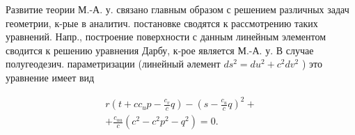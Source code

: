 \documentclass[10pt]{article}
\begin{document}
Развитие теории М.-А. у. связано главным образом с решением различных задач геометрии, к-рые в аналитич. постановке сводятся к рассмотрению таких уравнений. Напр., построение поверхности с данным линейным элементом сводится к решению уравнения Дарбу, к-рое является М.-А. у. В случае полугеодезич. параметризации (линейный әлемент $d s^{2}=d u^{2}+c^{2} d v^{2}$ ) это уравнение имеет вид



\[

\begin{gathered}

r\left(t+c c_{u} p-\frac{c_{v}}{c} q\right)-\left(s-\frac{c_{u}}{c} q\right)^{2}+ \\

+\frac{c_{u u}}{c}\left(c^{2}-c^{2} p^{2}-q^{2}\right)=0 .

\end{gathered}

\]
\end{document}

